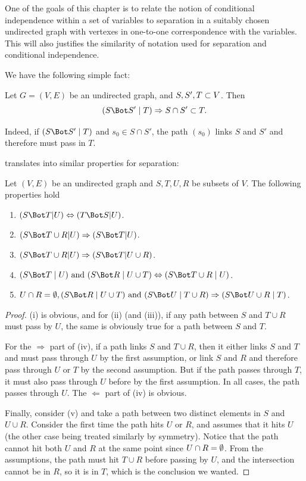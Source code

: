 One of the goals of this chapter is to relate the notion of
conditional independence within a set of variables to separation in a
suitably chosen undirected graph with vertexes in one-to-one
correspondence with the variables. This will also justifies the similarity of
notation  used for separation and conditional independence.

We have the following simple fact:
\begin{lemma}
\label{lem:simple.1}
Let $G=(V,E)$ be an undirected graph, and $S,S',T\subset V$. Then
\[
\cind{S}{S'}{T} \Ria S\cap S' \sub T.
\]
\end{lemma}
Indeed, if $\cind{S}{S'}{T}$ and $s_0 \in S\cap
S'$, the path $(s_0)$ links $S$ and $S'$ and therefore must pass in
$T$. 

  translates into similar
properties for separation:
\begin{proposition}
\label{prop:cind.2}
Let $(V, E)$ be an undirected graph and $S,T,U,R$ be subsets
of $V$. The following properties hold
\begin{enumerate}[label=(\roman*)]
\item $(S\indp T|U) \Leftrightarrow (T\indp S|U)$.
\item $(S\indp T\cup R|U) \Rightarrow (S\indp T|U)$.
\item $(S\indp T\cup R|U)  \Rightarrow
(S\indp T| U\cup R)$.
\item $\cind{S}{T}{U} \text{ and } \cind{S}{R}{U\cup T} \Leftrightarrow
\cind{S}{T\cup R}{U}$.
\item $U\cap R = \emp, \cind{S}{R}{U\cup T} \text{ and } \cind{S}{U}{T\cup R}
\Rightarrow \cind{S}{U\cup R}{T}$. 
\end{enumerate}
\end{proposition}
\begin{proof}
(i) is obvious, and for (ii) (and (iii)), if any path between $S$ and $T\cup R$
must pass by $U$, the same is obviously true for a path between $S$
and $T$. 

For the $\Rightarrow$ part of (iv), if a path links $S$ and
$T\cup R$, then it either links $S$ and $T$ and must pass through $U$
by the first assumption, or link $S$ and $R$ and therefore pass through
$U$ or $T$ by the second assumption. But if the path passes through
$T$, it must also pass through $U$ before by the first assumption. In
all cases, the path passes through $U$. The $\Leftarrow$ part of (iv)
is obvious.

Finally, consider (v) and take a path between two distinct elements in
$S$ and $U\cup R$. Consider the first time the path hits $U$ or $R$,
and assumes that it hits $U$ (the other case being treated similarly
by symmetry). Notice that the path cannot hit both $U$ and $R$ at the
same point since $U\cap R = \emptyset$. From the assumptions, the path must hit
$T\cup R$ before passing by $U$, and the intersection
cannot be  in $R$, so it is in $T$,
which is the conclusion we wanted.
\end{proof}


